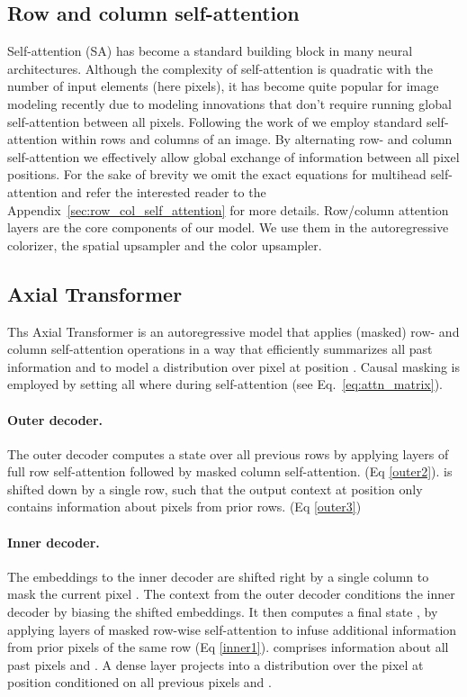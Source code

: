 \documentclass{article} \usepackage{iclr2021_conference,times}
\begin{document}
\subsection{Row and column self-attention}
\label{self_attention}

Self-attention (SA) has become a standard building block in many neural architectures. Although the complexity of self-attention is quadratic with the number of input elements (here pixels), it has become quite popular for image modeling recently \citep{parmar2018image, weissenborn2019scaling} due to modeling innovations that don't require running global self-attention between all pixels. Following the work of \citep{ho2019axial} we employ standard  self-attention \citep{vaswani2017attention} within rows and columns of an image. By alternating row- and column self-attention we effectively allow global exchange of information between all pixel positions. For the sake of brevity we omit the exact equations for multihead self-attention and refer the interested reader to the Appendix~\ref{sec:row_col_self_attention} for more details. Row/column attention layers are the core components of our model. We use them in the autoregressive colorizer, the spatial upsampler and the color upsampler.

\subsection{Axial Transformer}
\label{autorec_base}

Ths Axial Transformer \citep{ho2019axial} is an autoregressive model that applies (masked) row- and column self-attention operations in a way that efficiently summarizes all past information  and  to model a distribution over pixel  at position . Causal masking is employed by setting all  where  during self-attention (see Eq.~\ref{eq:attn_matrix}).

\paragraph{Outer decoder.} The outer decoder computes a state  over all previous rows  by applying  layers of full row self-attention followed by masked column self-attention. (Eq \ref{outer2}).    is shifted down by a single row, such that the output context  at position  only contains information about pixels  from prior rows. (Eq \ref{outer3})

\paragraph{Inner decoder.} The embeddings to the inner decoder are shifted right by a single column to mask the current pixel . The context  from the outer decoder conditions the inner decoder by biasing the shifted embeddings. It then computes a final state , by applying  layers of masked row-wise self-attention to infuse additional information from prior pixels of the same row  (Eq \ref{inner1}).  comprises information about all past pixels  and . A dense layer projects  into a distribution  over the pixel at position  conditioned on all previous pixels  and .
\end{document}
